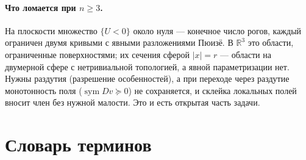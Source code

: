 \documentclass[11pt,a4paper]{article}
\theoremstyle{definition}
\newcommand{\R}{\mathbb R}
\newcommand{\sym}{\operatorname{sym}}
\begin{document}
\paragraph{Что ломается при $n\ge3$.} На плоскости множество $\{U<0\}$ около нуля --- конечное
число рогов, каждый ограничен двумя кривыми с явными разложениями Пюизё. В $\R^3$ это области,
ограниченные поверхностями; их сечения сферой $|x|=r$ --- области на двумерной сфере с
нетривиальной топологией, а явной параметризации нет. Нужны раздутия (разрешение особенностей),
а при переходе через раздутие монотонность поля ($\sym Dv\succeq0$) не сохраняется, и склейка
локальных полей вносит член без нужной малости. Это и есть открытая часть задачи.

\appendix
\section{Словарь терминов}\label{app:glossary}
\end{document}
